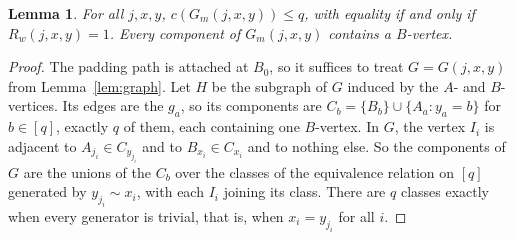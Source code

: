 \documentclass[11pt]{article}
\newtheorem{lemma}[theorem]{Lemma}
\theoremstyle{definition}
\theoremstyle{remark}
\begin{document}
\begin{lemma}\label{lem:components}
For all $j,x,y$, $c(G_m(j,x,y))\le q$, with equality if and only if
$R_w(j,x,y)=1$. Every component of $G_m(j,x,y)$ contains a $B$-vertex.
\end{lemma}
\begin{proof}
The padding path is attached at $B_0$, so it suffices to treat
$G=G(j,x,y)$ from Lemma~\ref{lem:graph}. Let $H$ be the subgraph of $G$
induced by the $A$- and $B$-vertices. Its edges are the $g_a$, so its
components are $C_b=\{B_b\}\cup\{A_a:y_a=b\}$ for $b\in[q]$, exactly $q$
of them, each containing one $B$-vertex. In $G$, the vertex $I_i$ is
adjacent to $A_{j_i}\in C_{y_{j_i}}$ and to $B_{x_i}\in C_{x_i}$ and to
nothing else. So the components of $G$ are the unions of the $C_b$ over
the classes of the equivalence relation on $[q]$ generated by
$y_{j_i}\sim x_i$, with each $I_i$ joining its class. There are $q$ classes
exactly when every generator is trivial, that is, when $x_i=y_{j_i}$ for
all $i$.
\end{proof}
\end{document}
